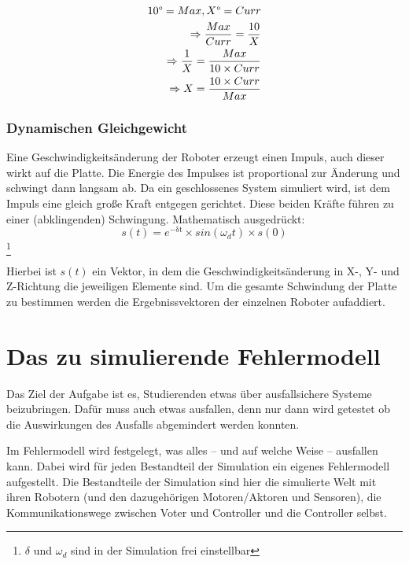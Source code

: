 \begin{align}\label{eq:tilt-from-maxtilt}
10\degree = Max, X\degree = Curr \\
\Rightarrow \frac{Max}{Curr} = \frac{10}{X} \\
\Rightarrow \frac{1}{X} = \frac{Max}{10 \times Curr} \\
\Rightarrow X = \frac{10 \times Curr}{Max}
\end{align}

\subsubsection{Dynamischen Gleichgewicht}
Eine Geschwindigkeits{\"{a}}nderung der Roboter erzeugt einen Impuls, auch dieser wirkt auf die Platte. Die Energie des Impulses ist proportional zur
{\"{A}}nderung und schwingt dann langsam ab. Da ein geschlossenes System simuliert wird, ist dem Impuls eine gleich gro{\ss}e Kraft entgegen gerichtet.
Diese beiden Kr{\"{a}}fte f{\"{u}}hren zu einer (abklingenden) Schwingung. Mathematisch ausgedr{\"{u}}ckt:
\begin{equation}\label{eq:schwingung}
	s(t) = e^\mathrm{-\delta t} \times sin(\omega_d t) \times s(0)
\end{equation}
\cite{wiki:schwingung}
\footnote{$\delta$ und $\omega_d$ sind in der Simulation frei einstellbar}

Hierbei ist $s(t)$ ein Vektor, in dem die Geschwindigkeits{\"{a}}nderung in X-, Y- und Z-Richtung die jeweiligen Elemente sind. Um die gesamte Schwindung der
Platte zu bestimmen werden die Ergebnissvektoren der einzelnen Roboter aufaddiert.

\clearpage
\section{Das zu simulierende Fehlermodell}\label{fm}
Das Ziel der Aufgabe ist es, Studierenden etwas {\"{u}}ber ausfallsichere Systeme beizubringen. Daf{\"{u}}r
muss auch etwas ausfallen, denn nur dann wird getestet ob die Auswirkungen des Ausfalls abgemindert werden 
konnten.

Im Fehlermodell wird festgelegt, was alles -- und auf welche Weise -- ausfallen kann. Dabei wird f{\"{u}}r jeden Bestandteil der Simulation ein eigenes Fehlermodell aufgestellt. Die Bestandteile
der Simulation sind hier die simulierte Welt mit ihren Robotern (und den dazugeh{\"{o}}rigen Motoren/Aktoren
und Sensoren), die Kommunikationswege zwischen Voter und Controller und die Controller selbst.


